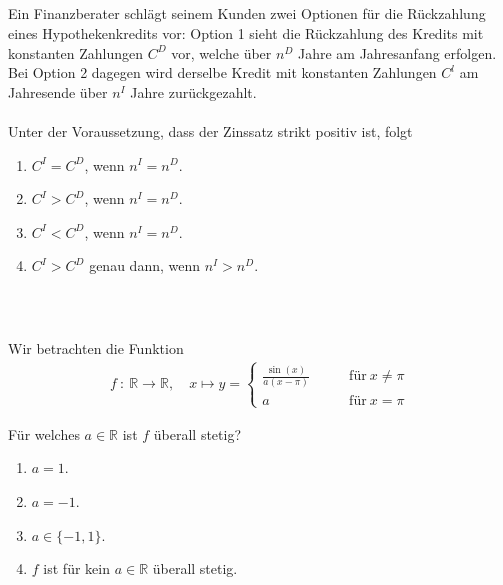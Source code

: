 \subsection*{}
Ein Finanzberater schlägt seinem Kunden zwei Optionen für die Rückzahlung eines Hypothekenkredits vor:
Option 1 sieht die Rückzahlung des Kredits mit konstanten Zahlungen $ C^D  $ vor, welche über $ n^D $ Jahre am Jahresanfang erfolgen. Bei Option 2 dagegen wird derselbe Kredit mit konstanten Zahlungen $ C^l $ am Jahresende über $ n^I $ Jahre zurückgezahlt.\\
\\
Unter der Voraussetzung, dass der Zinssatz strikt positiv ist, folgt
\renewcommand{\labelenumi}{(\alph{enumi})}
\begin{enumerate}
\item 
$ C^I = C^D$, wenn $ n^I = n^D $.
\item
$ C^I > C^D$, wenn $ n^I = n^D $.
\item
$ C^I < C^D$, wenn $ n^I = n^D $.
\item
$ C^I > C^D $ genau dann, wenn $ n^I > n^D $.
\end{enumerate}
\ \\
\subsection*{}
Wir betrachten die Funktion
\begin{align*}
f \ : \
\mathbb{R} \to \mathbb{R}, \quad 
x \mapsto
y = 
\begin{cases}
\frac{\sin(x)}{a(x- \pi)} &\qquad \text{für} \ x \neq \pi\\
a &\qquad \text{für} \ x = \pi
\end{cases}
\end{align*}

Für welches $ a \in \mathbb{R} $ ist $ f $ überall stetig?
\renewcommand{\labelenumi}{(\alph{enumi})}
\begin{enumerate}
\item 
$ a = 1 $.
\item
$ a = -1 $.
\item
$ a \in \{ -1, 1\} $.
\item
$ f $ ist für kein $ a \in \mathbb{R} $ überall stetig.
\end{enumerate}
\ \\
